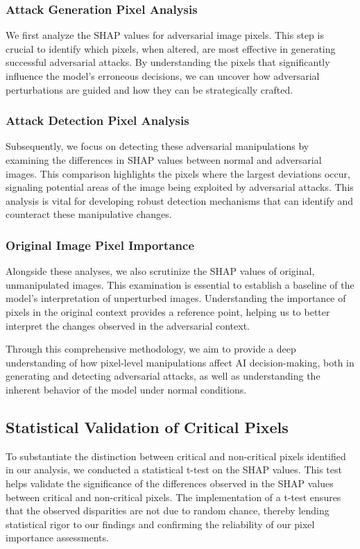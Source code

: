 \documentclass[10pt, conference, a4paper, final]{IEEEtran}
\begin{document}
    \subsubsection{Attack Generation Pixel Analysis}
We first analyze the SHAP values for adversarial image pixels. This step is crucial to identify which pixels, when altered, are most effective in generating successful adversarial attacks. By understanding the pixels that significantly influence the model's erroneous decisions, we can uncover how adversarial perturbations are guided and how they can be strategically crafted.

\subsubsection{Attack Detection Pixel Analysis}
Subsequently, we focus on detecting these adversarial manipulations by examining the differences in SHAP values between normal and adversarial images. This comparison highlights the pixels where the largest deviations occur, signaling potential areas of the image being exploited by adversarial attacks. This analysis is vital for developing robust detection mechanisms that can identify and counteract these manipulative changes.

\subsubsection{Original Image Pixel Importance}
Alongside these analyses, we also scrutinize the SHAP values of original, unmanipulated images. This examination is essential to establish a baseline of the model’s interpretation of unperturbed images. Understanding the importance of pixels in the original context provides a reference point, helping us to better interpret the changes observed in the adversarial context.

Through this comprehensive methodology, we aim to provide a deep understanding of how pixel-level manipulations affect AI decision-making, both in generating and detecting adversarial attacks, as well as understanding the inherent behavior of the model under normal conditions.
\subsection{Statistical Validation of Critical Pixels}
To substantiate the distinction between critical and non-critical pixels identified in our analysis, we conducted a statistical t-test on the SHAP values. This test helps validate the significance of the differences observed in the SHAP values between critical and non-critical pixels. The implementation of a t-test ensures that the observed disparities are not due to random chance, thereby lending statistical rigor to our findings and confirming the reliability of our pixel importance assessments.
\end{document}
